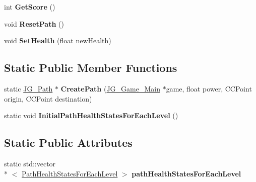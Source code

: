 \begin{DoxyCompactItemize}
\item 
\hypertarget{class_j_g___path_a89d017af63f4c259656dc58974e8313f}{int {\bfseries Get\-Score} ()}\label{class_j_g___path_a89d017af63f4c259656dc58974e8313f}

\item 
\hypertarget{class_j_g___path_a69f65dc51c5d9b563f9fb583ca709977}{void {\bfseries Reset\-Path} ()}\label{class_j_g___path_a69f65dc51c5d9b563f9fb583ca709977}

\item 
\hypertarget{class_j_g___path_a6b2f029431ab7238028e10613ce77343}{void {\bfseries Set\-Health} (float new\-Health)}\label{class_j_g___path_a6b2f029431ab7238028e10613ce77343}

\end{DoxyCompactItemize}
\subsection*{Static Public Member Functions}
\begin{DoxyCompactItemize}
\item 
\hypertarget{class_j_g___path_a334fac381e5a08f431cc35b2cd65c51d}{static \hyperlink{class_j_g___path}{J\-G\-\_\-\-Path} $\ast$ {\bfseries Create\-Path} (\hyperlink{class_j_g___game___main}{J\-G\-\_\-\-Game\-\_\-\-Main} $\ast$game, float power, C\-C\-Point origin, C\-C\-Point destination)}\label{class_j_g___path_a334fac381e5a08f431cc35b2cd65c51d}

\item 
\hypertarget{class_j_g___path_a6e8e797354d78246e0c4606484ba12be}{static void {\bfseries Initial\-Path\-Health\-States\-For\-Each\-Level} ()}\label{class_j_g___path_a6e8e797354d78246e0c4606484ba12be}

\end{DoxyCompactItemize}
\subsection*{Static Public Attributes}
\begin{DoxyCompactItemize}
\item 
\hypertarget{class_j_g___path_a4e191243a774ac461042854f526af39f}{static std\-::vector\\*
$<$ \hyperlink{struct_path_health_states_for_each_level}{Path\-Health\-States\-For\-Each\-Level} $>$ {\bfseries path\-Health\-States\-For\-Each\-Level}}\label{class_j_g___path_a4e191243a774ac461042854f526af39f}

\end{DoxyCompactItemize}


